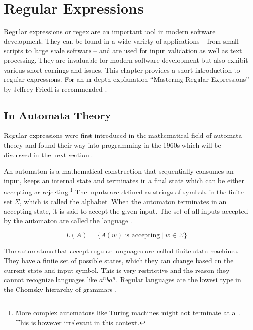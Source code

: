 
\chapter{Regular Expressions} \label{chapter:intro}

Regular expressions or regex are an important tool in modern software development. They can be found in a wide variety of applications -- from small scripts to large scale software -- and are used for input validation as well as text processing. They are invaluable for modern software development but also exhibit various short-comings and issues. This chapter provides a short introduction to regular expressions. For an in-depth explanation \enquote{Mastering Regular Expressions} by Jeffrey Friedl is recommended \cite{MasteringRegex}.

\section{In Automata Theory} \label{sec:regexInAutomata}

Regular expressions were first introduced in the mathematical field of automata theory and found their way into programming in the 1960s which will be discussed in the next section \cite{RegularExpressionSearchAlgorithm}. 

An automaton is a mathematical construction that sequentially consumes an input, keeps an internal state and terminates in a final state which can be either accepting or rejecting.\footnote{More complex automatons like Turing machines might not terminate at all. This is however irrelevant in this context.} The inputs are defined as strings of symbols in the finite set $\Sigma$, which is called the alphabet. When the automaton terminates in an accepting state, it is said to accept the given input. The set of all inputs accepted by the automaton are called the language \cite[13]{TheoryOfComputation}.

\begin{equation*}
L(A) \coloneqq \{ A(w)\text{ is accepting} \mid w \in \Sigma \}
\end{equation*}

The automatons that accept regular languages are called finite state machines. They have a finite set of possible states, which they can change based on the current state and input symbol. This is very restrictive and the reason they cannot recognize languages like $a^nba^n$. Regular languages are the lowest type in the Chomsky hierarchy of grammars \cite{ChomskyCertainFormalPropertiesGrammars}. 

